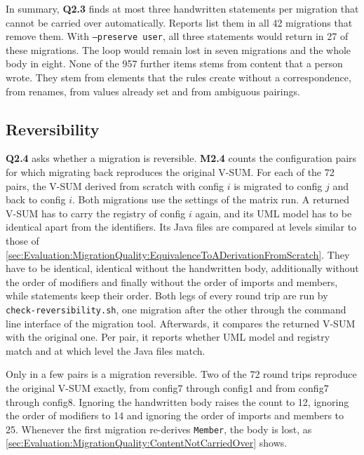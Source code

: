 In summary, \textbf{Q2.3} finds at most three handwritten statements per migration that cannot be carried over automatically.
Reports list them in all 42 migrations that remove them.
With \texttt{--preserve user}, all three statements would return in 27 of these migrations.
The loop would remain lost in seven migrations and the whole body in eight.
None of the 957 further items stems from content that a person wrote.
They stem from elements that the rules create without a correspondence, from renames, from values already set and from ambiguous pairings.

\subsection{Reversibility}
\label{sec:Evaluation:MigrationQuality:Reversibility}

\textbf{Q2.4} asks whether a migration is reversible.
\textbf{M2.4} counts the configuration pairs for which migrating back reproduces the original V-SUM.
For each of the 72 pairs, the V-SUM derived from scratch with config $i$ is migrated to config $j$ and back to config $i$.
Both migrations use the settings of the matrix run.
A returned V-SUM has to carry the registry of config $i$ again, and its UML model has to be identical apart from the identifiers.
Its Java files are compared at levels similar to those of \autoref{sec:Evaluation:MigrationQuality:EquivalenceToADerivationFromScratch}.
They have to be identical, identical without the handwritten body, additionally without the order of modifiers and finally without the order of imports and members, while statements keep their order.
Both legs of every round trip are run by \texttt{check-reversibility.sh}, one migration after the other through the command line interface of the migration tool.
Afterwards, it compares the returned V-SUM with the original one.
Per pair, it reports whether UML model and registry match and at which level the Java files match.

Only in a few pairs is a migration reversible.
Two of the 72 round trips reproduce the original V-SUM exactly, from config7 through config1 and from config7 through config8.
Ignoring the handwritten body raises the count to 12, ignoring the order of modifiers to 14 and ignoring the order of imports and members to 25.
Whenever the first migration re-derives \texttt{Member}, the body is lost, as \autoref{sec:Evaluation:MigrationQuality:ContentNotCarriedOver} shows.

